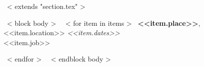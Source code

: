~< extends "section.tex" >~

~< block body >~
~< for item in items >~
    {\bf <<item.place>>}, <<item.location>> \hfill {\it <<item.dates>> }
    \\
    {<<item.job>>}

~< endfor >~
~< endblock body >~
